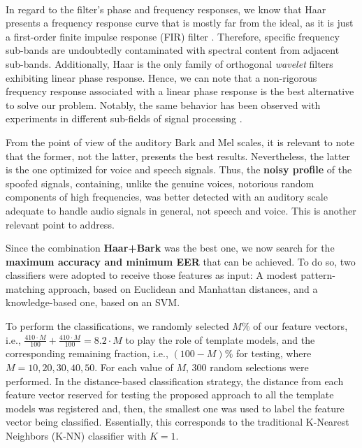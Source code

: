 		\\
		\par In regard to the filter's phase and frequency responses, we know that Haar presents a frequency response curve that is mostly far from the ideal, as it is just a first-order finite impulse response (FIR) filter \cite{WaveletPropertiesBrowser}. Therefore, specific frequency sub-bands are undoubtedly contaminated with spectral content from adjacent sub-bands. Additionally, Haar is the only family of orthogonal \textit{wavelet} filters exhibiting linear phase response. Hence, we can note that a non-rigorous frequency response associated with a linear phase response is the best alternative to solve our problem. Notably, the same behavior has been observed with experiments in different sub-fields of signal processing \cite{guido2}\cite{guido3}\cite{guido4}. 
		\\
		\par From the point of view of the auditory Bark and Mel scales, it is relevant to note that the former, not the latter, presents the best results. Nevertheless, the latter is the one optimized for voice and speech signals. Thus, the \textbf{noisy profile} of the spoofed signals, containing, unlike the genuine voices, notorious random components of high frequencies, was better detected with an auditory scale adequate to handle audio signals in general, not speech and voice. This is another relevant point to address.
		
		
		
		\par Since the combination \textbf{Haar+Bark} was the best one, we now search for the \textbf{maximum accuracy and minimum EER} that can be achieved. To do so, two classifiers were adopted to receive those features as input: A modest pattern-matching approach, based on Euclidean and Manhattan distances, and a knowledge-based one, based on an SVM. 
		\\
		\par To perform the classifications, we randomly selected $M\%$ of our feature vectors, i.e., $\frac{410 \cdot M}{100} + \frac{410 \cdot M}{100} = 8.2 \cdot M$ to play the role of template models, and the corresponding remaining fraction, i.e., $(100-M)\%$ for testing, where $M=10, 20, 30, 40, 50$. For each value of $M$, 300 random selections were performed. In the distance-based classification strategy, the distance from each feature vector reserved for testing the proposed approach to all the template models was registered and, then, the smallest one was used to label the feature vector being classified. Essentially, this corresponds to the traditional K-Nearest Neighbors (K-NN) classifier with $K=1$.     
	
